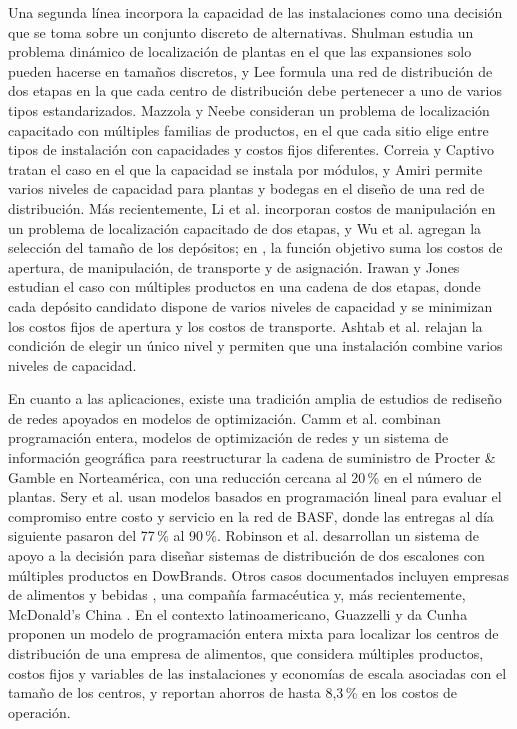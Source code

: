 \documentclass[fleqn, 11pt,letterpaper]{article}
\begin{document}
Una segunda línea incorpora la capacidad de las instalaciones como una decisión que se toma sobre un conjunto discreto de alternativas. Shulman \cite{Shu91} estudia un problema dinámico de localización de plantas en el que las expansiones solo pueden hacerse en tamaños discretos, y Lee \cite{Lee96} formula una red de distribución de dos etapas en la que cada centro de distribución debe pertenecer a uno de varios tipos estandarizados. Mazzola y Neebe \cite{Maz99} consideran un problema de localización capacitado con múltiples familias de productos, en el que cada sitio elige entre tipos de instalación con capacidades y costos fijos diferentes. Correia y Captivo \cite{Cor03b} tratan el caso en el que la capacidad se instala por módulos, y Amiri \cite{Ami05} permite varios niveles de capacidad para plantas y bodegas en el diseño de una red de distribución. Más recientemente, Li et al. \cite{Li14} incorporan costos de manipulación en un problema de localización capacitado de dos etapas, y Wu et al. \cite{Wu15b, Wu19} agregan la selección del tamaño de los depósitos; en \cite{Wu19}, la función objetivo suma los costos de apertura, de manipulación, de transporte y de asignación. Irawan y Jones \cite{Ira19} estudian el caso con múltiples productos en una cadena de dos etapas, donde cada depósito candidato dispone de varios niveles de capacidad y se minimizan los costos fijos de apertura y los costos de transporte. Ashtab et al. \cite{Ash19} relajan la condición de elegir un único nivel y permiten que una instalación combine varios niveles de capacidad.

En cuanto a las aplicaciones, existe una tradición amplia de estudios de rediseño de redes apoyados en modelos de optimización. Camm et al. \cite{Cam97} combinan programación entera, modelos de optimización de redes y un sistema de información geográfica para reestructurar la cadena de suministro de Procter \& Gamble en Norteamérica, con una reducción cercana al 20\,\% en el número de plantas. Sery et al. \cite{Ser01} usan modelos basados en programación lineal para evaluar el compromiso entre costo y servicio en la red de BASF, donde las entregas al día siguiente pasaron del 77\,\% al 90\,\%. Robinson et al. \cite{Rob93} desarrollan un sistema de apoyo a la decisión para diseñar sistemas de distribución de dos escalones con múltiples productos en DowBrands. Otros casos documentados incluyen empresas de alimentos y bebidas \cite{Poo94, Kok95, Wou02}, una compañía farmacéutica \cite{Rab08} y, más recientemente, McDonald's China \cite{Tan25}. En el contexto latinoamericano, Guazzelli y da Cunha \cite{Gua14} proponen un modelo de programación entera mixta para localizar los centros de distribución de una empresa de alimentos, que considera múltiples productos, costos fijos y variables de las instalaciones y economías de escala asociadas con el tamaño de los centros, y reportan ahorros de hasta 8,3\,\% en los costos de operación.
\end{document}
